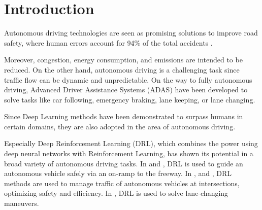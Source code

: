 \documentclass[review]{elsarticle}
\providecommand{\martin}[1]{#1}                  %
\providecommand{\martinc}[1]{}                  %
\providecommand{\3}{{\ss}}
\begin{document}
\section{Introduction}
Autonomous driving technologies are seen as promising solutions to
improve road safety, where human errors account for 94\% of the total
accidents \citep{vehicleCrashSurvey2015}.  
\martinc{Das ``author'' Attribut in Bibtex darf man nicht
  fuer anderes missbrauchen, da je nach Zitierstil nur zwei Autoren
  drankommen und bibtex diverse andere Manipulationen vornimmt; .bib
  File korrigiert.}
  \martinc{citep=cite with parentheses}
Moreover, congestion, energy
consumption, and emissions \martinc{Die Englaender haben bei
  Aufzaehlungen von $\ge 3$ items auch vor dem ``and'' ein Komma} are intended to be reduced. 
\martin{On the other hand,} autonomous driving is a challenging task
since \martin{traffic flow} can be dynamic and unpredictable.
On the way to fully autonomous driving, Advanced Driver Assistance Systems
(ADAS) have been developed to solve tasks like car following, emergency
braking, lane keeping, or lane changing. \martinc{``like'' startet
  bereits eine unvollst\"andige Aufz\"ahlung, so no need for ``etc.''}
\martinc{Bindestriche in zusammengesetzten Worten gibt es i.A. nur bei 
  $\ge 3$ Teilen, und zwar in alle L\"ucken au\3er der letzten, also
  \emph{lane changing} aber \emph{lane-changing model}}
Since Deep Learning methods have been demonstrated to surpass humans
in certain domains, they are also adopted in the area of autonomous
driving.
\martinc{Generelles ueber which vs. that: 
1. \emph{which mit Komma:}
  ``non-defining clauses'': der darauf folgende Relativsatz gibt interessante Details,
  schraenkt das Subjekt/Objekt im Hauptsatz aber nicht ein (I use my bike, which has 18
  gears, rather often)
2. \emph{which ohne Komma oder besser ``that'' oder ein Gerund (``ing-Form''):} ``defining clauses''. Der darauf folgende Relativsatz enthaelt einschraenkende,
wesentliche Informationen: ``The bike that/which has a
broken chain/having a broken chain is in the garage'' (impliziert,
dass ich mindestens ein zweites Rad habe). Im Folgenden ist eine ``nice-to
mention''-Definition, also ist which mit Komma OK, oft folgen bei dir dann
aber defining clauses, die ich durch ``that'', ``who'' (bei Menschen)
oder einem Gerund ersetzt habe. Pedantische Korrewktoren nennen das
auch ``which hunting'' (witch=Hexe)}
Especially Deep Reinforcement Learning (DRL), which combines the power
using deep neural networks with Reinforcement Learning, has shown its potential in a broad variety of autonomous driving tasks. 
In \cite{OnRampMerge2018} and \cite{OnRampMerge2020}, DRL is used to
guide an autonomous vehicle safely via an on-ramp to the freeway. In \cite{intersection1}, \cite{intersection3} and \cite{intersection2}, DRL methods are used to manage traffic of autonomous vehicles at intersections, optimizing safety and efficiency.
In \cite{LangeChange1}, DRL is used to solve lane-changing maneuvers.
\end{document}
